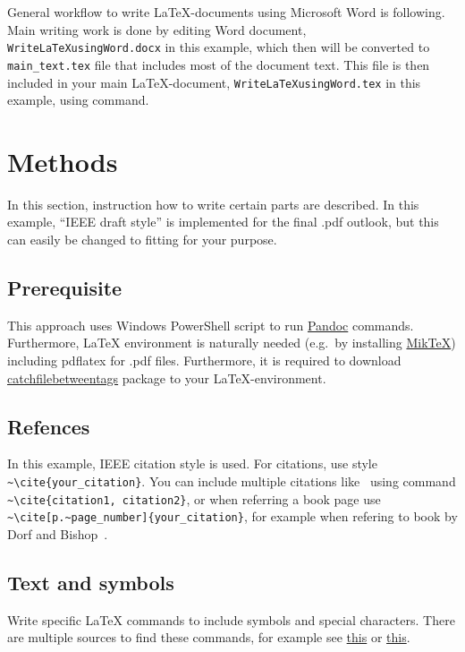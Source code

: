 General workflow to write \LaTeX{}-documents using Microsoft Word is following. Main writing work is done by editing
Word document, \verb|WriteLaTeXusingWord.docx| in this example, which then will be converted to \verb|main_text.tex|
file that includes most of the document text. This file is then included in your main \LaTeX{}-document,
\verb|WriteLaTeXusingWord.tex| in this example, using \verb|| command.

\section{Methods}

In this section, instruction how to write certain parts are described. In this example, ``IEEE draft style'' is
implemented for the final .pdf outlook, but this can easily be changed to fitting for your purpose.

\subsection{Prerequisite}

This approach uses Windows PowerShell script to run \href{https://pandoc.org/}{Pandoc} commands. Furthermore, \LaTeX{}
environment is naturally needed (e.g.~by installing \href{https://miktex.org/}{MikTeX}) including pdflatex for .pdf
files. Furthermore, it is required to download
\href{ https://www.ctan.org/pkg/catchfilebetweentags}{catchfilebetweentags} package to your \LaTeX{}-environment.

\subsection{Refences}

In this example, IEEE citation style is used. For citations, use style \verb|~\cite{your_citation}|. You can include
multiple citations like~\cite{Maki2018, Maki2016} using command \verb|~\cite{citation1, citation2}|, or
when referring a book page use \verb|~\cite[p.~page_number]{your_citation}|, for example when refering to book by Dorf
and Bishop~\cite[p.~391]{Dorf2005}.

\subsection{Text and symbols}

Write specific \LaTeX{} commands to include symbols and special characters. There are multiple sources to find these
commands, for example see \href{https://artofproblemsolving.com/wiki/index.php/LaTeX:Symbols}{this} or
\href{https://oeis.org/wiki/List_of_LaTeX_mathematical_symbols}{this}.

